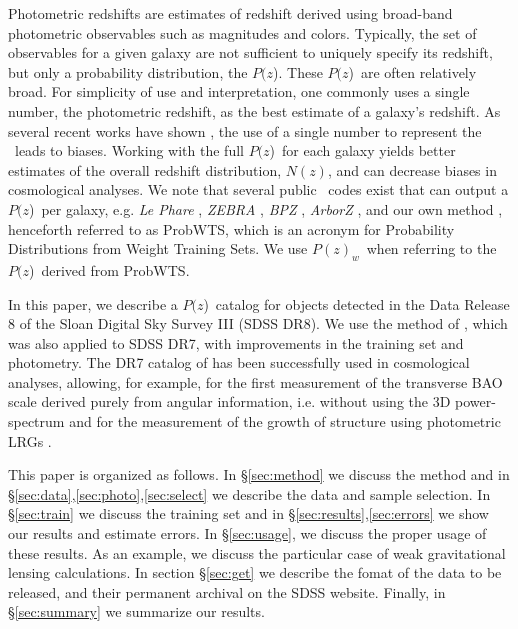 \documentclass[preprint]{aastex}
\newcommand{\pofz}{$P(z$)}
\newcommand{\pofzw}{$P(z)_w$\ }
\newcommand{\acronym}{ProbWTS}
\begin{document}
Photometric redshifts are estimates of redshift derived using broad-band
photometric observables such as magnitudes and colors.  Typically, the set of
observables for a given galaxy are not sufficient to uniquely specify its
redshift, but only a probability distribution, the \pofz.  These \pofz\ are
often relatively broad. For simplicity of use and interpretation, one commonly
uses a single number, the photometric redshift, as the best estimate of a
galaxy's redshift.  As several recent works have shown
\citep{man08,CunhaPhotoz09,wit09,bor10,abr11}, the use of a single number to
represent the \photoz\ leads to biases.  Working with the full \pofz\ for each
galaxy yields better estimates of the overall redshift distribution, $N(z)$,
and can decrease biases in cosmological analyses.  We note that several public
\photoz\ codes exist that can output a \pofz\ per galaxy, e.g.  {\it Le Phare}
\citep{arn99,ilb06}, {\it ZEBRA} \citep{fel06}, {\it BPZ} \citep{coe06}, {\it
ArborZ} \citep{ger10}, and our own method \citep{CunhaPhotoz09}, henceforth
referred to as \acronym, which is an acronym for Probability Distributions from
Weight Training Sets.  We use \pofzw when referring to the \pofz\  derived from
\acronym.



In this paper, we describe a \pofz\ catalog for objects detected in the Data
Release 8 of the Sloan Digital Sky Survey III (SDSS DR8).  We use the method of
\citet{CunhaPhotoz09}, which was also applied to SDSS DR7, with improvements in
the training set and photometry.  The DR7 catalog of \cite{CunhaPhotoz09} has
been successfully used in cosmological analyses, allowing, for example, for the
first measurement of the transverse BAO scale derived purely from angular
information, i.e. without using the 3D power-spectrum \citep{car11}  and for
the measurement of the growth of structure using photometric LRGs
\citep{cro11}. 

This paper is organized as follows.  In \S \ref{sec:method} we discuss the
method and in \S \ref{sec:data},\ref{sec:photo},\ref{sec:select} we describe
the data and sample selection. In \S \ref{sec:train} we discuss the training
set and in \S \ref{sec:results},\ref{sec:errors} we show our results and
estimate errors.  In \S \ref{sec:usage}, we discuss the proper usage of these
results. As an example, we discuss the particular case of weak gravitational
lensing calculations.  In section \S \ref{sec:get} we describe the fomat of the
data to be released, and their permanent archival on the SDSS website.
Finally, in \S \ref{sec:summary} we summarize our results.
\end{document}
